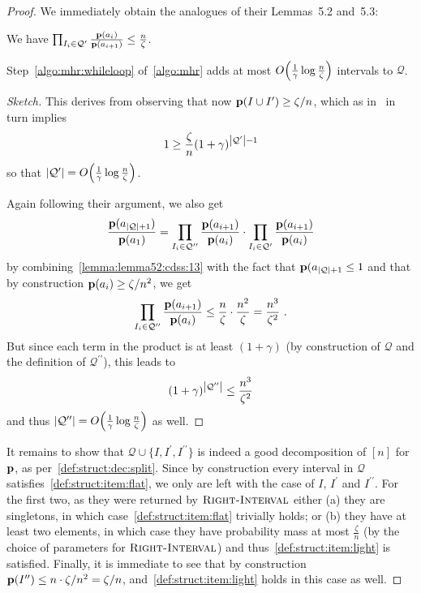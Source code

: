 \begin{proof}
\noindent We immediately obtain the analogues of their Lemmas~5.2 and~5.3:
\begin{lemma}\label{lemma:lemma52:cdss:13}
We have $\prod_{I_i\in\mathcal{Q}^\prime} \frac{\mathbf{p}(a_i)}{\mathbf{p}(a_{i+1})} \leq \frac{n}{\zeta}$.
\end{lemma}
\begin{lemma}
Step~\ref{algo:mhr:whileloop} of~\cref{algo:mhr} adds at most $\bigO{\frac{1}{\gamma}\log\frac{n}{\zeta}}$ intervals to $\mathcal{Q}$.
\end{lemma}
\begin{proof}[Sketch]
This derives from observing that now $\mathbf{p}(I\cup I^\prime) \geq \zeta/n$, which as in~\cite[Lemma~5.3]{CDSS:13} in turn implies 
\[
  1 \geq \frac{\zeta}{n}(1+\gamma)^{\left\lvert \mathcal{Q}^{\prime} \right\rvert-1}
\]
so that $\abs{\mathcal{Q}^{\prime}} = \bigO{\frac{1}{\gamma}\log\frac{n}{\zeta}}$.

\noindent Again following their argument, we also get 
\[
  \frac{\mathbf{p}(a_{\left\lvert \mathcal{Q} \right\rvert+1})}{\mathbf{p}(a_1)} = \prod_{I_i\in\mathcal{Q}^{\prime\prime}} \frac{\mathbf{p}(a_{i+1})}{\mathbf{p}(a_i)}\cdot \prod_{I_i\in\mathcal{Q}^\prime} \frac{\mathbf{p}(a_{i+1})}{\mathbf{p}(a_i)}
\]
by combining~\cref{lemma:lemma52:cdss:13} with the fact that $\mathbf{p}(a_{\left\lvert \mathcal{Q} \right\rvert+1} \leq 1$ and that by construction $\mathbf{p}(a_i) \geq \zeta/n^2$, we get 
\[
    \prod_{I_i\in\mathcal{Q}^{\prime\prime}} \frac{\mathbf{p}(a_{i+1})}{\mathbf{p}(a_i)} \leq \frac{n}{\zeta} \cdot \frac{n^2}{\zeta} = \frac{n^3}{\zeta^2}\ .
\] 
But since each term in the product is at least $(1+\gamma)$ (by construction of $\mathcal{Q}$ and the definition of $\mathcal{Q}^{\prime\prime}$), this leads to
\[
  (1+\gamma)^{\left\lvert  \mathcal{Q}^{\prime\prime}  \right\rvert} \leq \frac{n^3}{\zeta^2}
\]
and thus $\abs{ \mathcal{Q}^{\prime\prime} } = \bigO{\frac{1}{\gamma}\log\frac{n}{\zeta}}$ as well.
\end{proof}

It remains to show that $\mathcal{Q}\cup\{I,I^{\prime},I^{\prime\prime}\}$ is indeed a good decomposition of $[n]$ for $\mathbf{p}$, as per~\cref{def:struct:dec:split}. Since by construction every interval in $\mathcal{Q}$ satisfies~\cref{def:struct:item:flat}, we only are left with the case of $I$, $I^{\prime}$ and $I^{\prime\prime}$. For the first two, as they were returned by $\textsc{Right-Interval}$ either \textsf{(a)} they are singletons, in which case~\cref{def:struct:item:flat} trivially holds; or \textsf{(b)} they have at least two elements, in which case they have probability mass at most $\frac{\zeta}{n}$ (by the choice of parameters for $\textsc{Right-Interval}$) and thus~\cref{def:struct:item:light} is satisfied. Finally, it is immediate to see that by construction $\mathbf{p}(I^{\prime\prime}) \leq n\cdot \zeta/n^2 = \zeta/n$, and~\cref{def:struct:item:light} holds in this case as well.
\end{proof}
 
